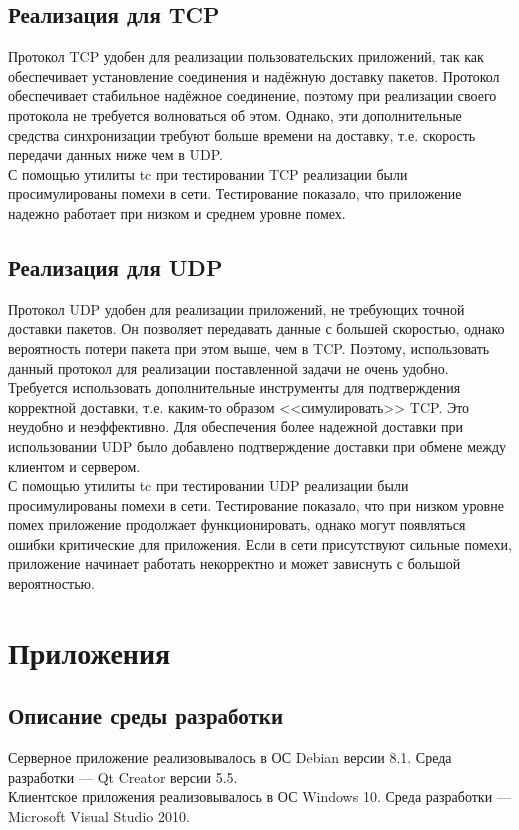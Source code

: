 \documentclass[12pt,a4paper]{report}
\begin{document}
\section{Реализация для TCP}
Протокол TCP удобен для реализации пользовательских приложений, так как обеспечивает установление соединения и надёжную доставку пакетов. Протокол обеспечивает стабильное надёжное соединение, поэтому при реализации своего протокола не требуется волноваться об этом. Однако, эти дополнительные средства синхронизации требуют больше времени на доставку, т.е. скорость передачи данных ниже чем в UDP.\\
С помощью утилиты tc при тестировании TCP реализации были просимулированы помехи в сети. Тестирование показало, что приложение надежно работает при низком и среднем уровне помех.
\section{Реализация для UDP}
Протокол UDP удобен для реализации приложений, не требующих точной доставки пакетов. Он позволяет передавать данные с большей скоростью, однако вероятность потери пакета при этом выше, чем в TCP. Поэтому, использовать данный протокол для реализации поставленной задачи не очень удобно. Требуется использовать дополнительные инструменты для подтверждения корректной доставки, т.е. каким-то образом <<симулировать>> TCP. Это неудобно и неэффективно.
Для обеспечения более надежной доставки при использовании UDP было добавлено подтверждение доставки при обмене между клиентом и сервером.\\
С помощью утилиты tc при тестировании UDP реализации были просимулированы помехи в сети. Тестирование показало, что при низком уровне помех приложение продолжает функционировать, однако могут появляться ошибки критические для приложения. Если в сети присутствуют сильные помехи, приложение начинает работать некорректно и может зависнуть с большой вероятностью.
\chapter*{Приложения}
\section*{Описание среды разработки}
Серверное приложение реализовывалось в ОС Debian версии 8.1. Среда разработки --- Qt Creator версии 5.5. \\
Клиентское приложения реализовывалось в ОС Windows 10. Среда разработки --- Microsoft Visual Studio 2010.
\end{document}
